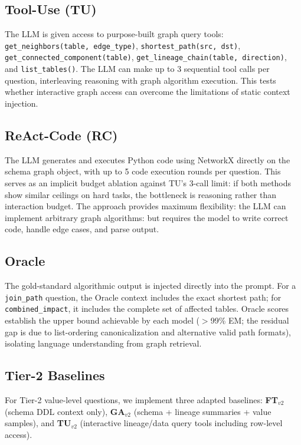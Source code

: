 \subsection{Tool-Use (TU)}

The LLM is given access to purpose-built graph query tools:
\texttt{get\_neighbors(table, edge\_type)},
\texttt{shortest\_path(src, dst)},
\texttt{get\_connected\_component(table)},
\texttt{get\_lineage\_chain(table, direction)}, and
\texttt{list\_tables()}.  The LLM can make up to 3 sequential tool calls
per question, interleaving reasoning with graph algorithm execution.
This tests whether interactive graph access can overcome the limitations
of static context injection.

\subsection{ReAct-Code (RC)}

The LLM generates and executes Python code using NetworkX directly on the
schema graph object, with up to 5 code execution rounds per question.
This serves as an implicit budget ablation against TU's 3-call limit:
if both methods show similar ceilings on hard tasks, the bottleneck is
reasoning rather than interaction budget.  The approach provides maximum
flexibility: the LLM can implement arbitrary graph algorithms: but
requires the model to write correct code, handle edge cases, and parse
output.

\subsection{Oracle}

The gold-standard algorithmic output is injected directly into the prompt.
For a \texttt{join\_path} question, the Oracle context includes the exact
shortest path; for \texttt{combined\_impact}, it includes the complete set
of affected tables.  Oracle scores establish the upper bound achievable by
each model ($>$99\% EM; the residual gap is due to list-ordering
canonicalization and alternative valid path formats), isolating language
understanding from graph retrieval.

\subsection{Tier-2 Baselines}

For Tier-2 value-level questions, we implement three adapted baselines:
\textbf{FT$_{v2}$} (schema DDL context only),
\textbf{GA$_{v2}$} (schema + lineage summaries + value samples), and
\textbf{TU$_{v2}$} (interactive lineage/data query tools including
row-level access).
